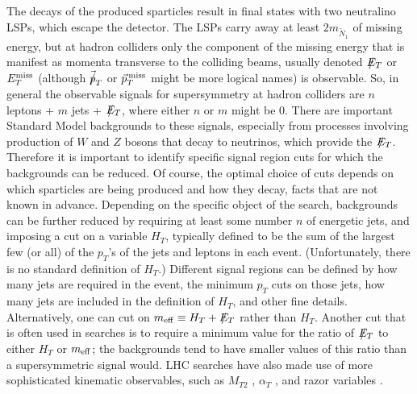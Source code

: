 \documentclass[11pt]{article}
\def\stilde{\widetilde}
\def\NI{\stilde N_1}
\def\Et{{\slashchar{E}_T}}
\def\slashchar#1{\setbox0=\hbox{$#1$}           %
   \dimen0=\wd0                                 %
   \setbox1=\hbox{/} \dimen1=\wd1               %
   \ifdim\dimen0>\dimen1                        %
      \rlap{\hbox to \dimen0{\hfil/\hfil}}      %
      #1                                        %
   \else                                        %
      \rlap{\hbox to \dimen1{\hfil$#1$\hfil}}   %
      /                                         %
   \fi}                                        %
\begin{document}
The decays of the produced sparticles result in final states with two 
neutralino LSPs, which escape the detector. The LSPs carry away at 
least $2 m_{\NI}$ of missing energy, but at hadron colliders only the 
component of the missing energy that is manifest as momenta transverse to 
the colliding beams, usually denoted $\Et$ or $E_T^{\rm miss}$ 
(although $\vec{\slashchar{p}}_T$ or $\vec{p}_T^{\hspace{1.5pt}\rm miss}$ 
might be more logical names) is observable. 
So, in general 
the observable signals for supersymmetry at hadron colliders are $n$ 
leptons + $m$ jets + $\Et$, where either $n$ or $m$ might be 0. There are 
important Standard Model backgrounds to these signals, especially 
from processes involving production of $W$ and $Z$ bosons that decay to 
neutrinos, which provide the $\Et$. Therefore it is important to identify 
specific signal region cuts for which the backgrounds can be reduced. Of course, 
the optimal choice of cuts  
depends on which sparticles are being produced and how they decay, facts that are not known in advance. Depending on the specific object of the search,
backgrounds can be further reduced by 
requiring at least some number $n$ of 
energetic jets, and imposing a cut on a variable $H_T$, 
typically defined to be the sum of the largest 
few (or all) of the $p_T$'s of the jets and leptons in each event. (Unfortunately, there is no standard definition of $H_T$.) Different signal regions can be defined by
how many jets are required in the event, the minimum $p_T$ cuts on those jets, how many 
jets are included in the definition of $H_T$, and other fine details. 
Alternatively, one can cut on $m_{\rm eff} \equiv H_T + \Et$ rather than $H_T$. 
Another cut that is often used in searches is to require a minimum value for the ratio of 
$\Et$ to either $H_T$ or $m_{\rm eff}$; the backgrounds tend to 
have smaller values of this ratio than a supersymmetric signal would.
LHC searches have also made use of more sophisticated kinematic observables,
such as $M_{T2}$ \cite{MT2}, $\alpha_T$ \cite{alphaT}, and razor variables
\cite{razor}.
\end{document}

